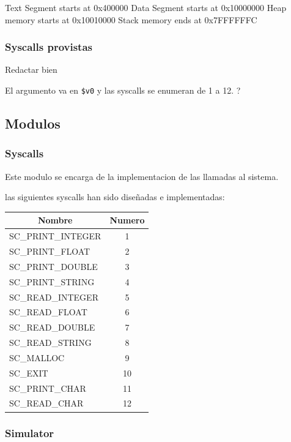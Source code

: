 \documentclass[12pt]{article}
\begin{document}
Text Segment starts at 0x400000
Data Segment starts at 0x10000000
Heap memory starts at 0x10010000
Stack memory ends at 0x7FFFFFFC
\subsubsection{Syscalls provistas}
Redactar bien

El argumento va en \texttt{\$v0} y las syscalls se enumeran de 1 a 12. ?

\subsection{Modulos}
\subsubsection{Syscalls}
Este modulo se encarga de la implementacion de las llamadas al sistema.

las siguientes syscalls han sido diseñadas e implementadas:

\begin{table}[H]
\centering
\begin{tabular}{@{}lc@{}}
\toprule
\multicolumn{1}{c}{Nombre} & Numero \\ \midrule
SC\_PRINT\_INTEGER                        & 1      \\
SC\_PRINT\_FLOAT                        & 2      \\
SC\_PRINT\_DOUBLE                        & 3      \\
SC\_PRINT\_STRING                       & 4      \\
SC\_READ\_INTEGER                        & 5      \\
SC\_READ\_FLOAT                        & 6      \\
SC\_READ\_DOUBLE                        & 7      \\
SC\_READ\_STRING                       & 8      \\
SC\_MALLOC                       & 9      \\
SC\_EXIT                       & 10      \\
SC\_PRINT\_CHAR                       & 11      \\
SC\_READ\_CHAR                       & 12      \\
\end{tabular}%
\end{table}

\subsubsection{Simulator}
\end{document}
